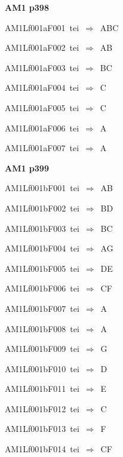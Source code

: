 \par\vfill\eject
{\bf\hfill AM1 p398\hfill\hbox{}}\par\bigskip
{\sixrm AM1Lf001aF001\ {\sixit tei}\ }$\Rightarrow$\ ABC\par\smallskip
{\sixrm AM1Lf001aF002\ {\sixit tei}\ }$\Rightarrow$\ AB\par\smallskip
{\sixrm AM1Lf001aF003\ {\sixit tei}\ }$\Rightarrow$\ BC\par\smallskip
{\sixrm AM1Lf001aF004\ {\sixit tei}\ }$\Rightarrow$\ C\par\smallskip
{\sixrm AM1Lf001aF005\ {\sixit tei}\ }$\Rightarrow$\ C\par\smallskip
{\sixrm AM1Lf001aF006\ {\sixit tei}\ }$\Rightarrow$\ A\par\smallskip
{\sixrm AM1Lf001aF007\ {\sixit tei}\ }$\Rightarrow$\ A\par\smallskip

\par\vfill\eject
{\bf\hfill AM1 p399\hfill\hbox{}}\par\bigskip
{\sixrm AM1Lf001bF001\ {\sixit tei}\ }$\Rightarrow$\ AB\par\smallskip
{\sixrm AM1Lf001bF002\ {\sixit tei}\ }$\Rightarrow$\ BD\par\smallskip
{\sixrm AM1Lf001bF003\ {\sixit tei}\ }$\Rightarrow$\ BC\par\smallskip
{\sixrm AM1Lf001bF004\ {\sixit tei}\ }$\Rightarrow$\ AG\par\smallskip
{\sixrm AM1Lf001bF005\ {\sixit tei}\ }$\Rightarrow$\ DE\par\smallskip
{\sixrm AM1Lf001bF006\ {\sixit tei}\ }$\Rightarrow$\ CF\par\smallskip
{\sixrm AM1Lf001bF007\ {\sixit tei}\ }$\Rightarrow$\ A\par\smallskip
{\sixrm AM1Lf001bF008\ {\sixit tei}\ }$\Rightarrow$\ A\par\smallskip
{\sixrm AM1Lf001bF009\ {\sixit tei}\ }$\Rightarrow$\ G\par\smallskip
{\sixrm AM1Lf001bF010\ {\sixit tei}\ }$\Rightarrow$\ D\par\smallskip
{\sixrm AM1Lf001bF011\ {\sixit tei}\ }$\Rightarrow$\ E\par\smallskip
{\sixrm AM1Lf001bF012\ {\sixit tei}\ }$\Rightarrow$\ C\par\smallskip
{\sixrm AM1Lf001bF013\ {\sixit tei}\ }$\Rightarrow$\ F\par\smallskip
{\sixrm AM1Lf001bF014\ {\sixit tei}\ }$\Rightarrow$\ CF\par\smallskip

